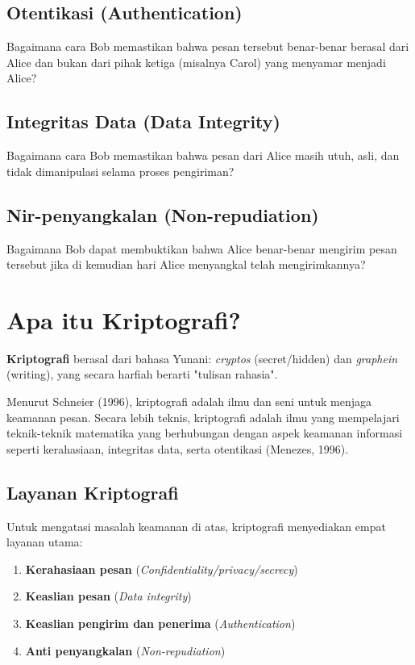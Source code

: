 \documentclass[../main.tex]{subfiles}
\begin{document}
\subsection{Otentikasi (Authentication)}
Bagaimana cara Bob memastikan bahwa pesan tersebut benar-benar berasal dari Alice dan bukan dari pihak ketiga (misalnya Carol) yang menyamar menjadi Alice?

\subsection{Integritas Data (Data Integrity)}
Bagaimana cara Bob memastikan bahwa pesan dari Alice masih utuh, asli, dan tidak dimanipulasi selama proses pengiriman?

\subsection{Nir-penyangkalan (Non-repudiation)}
Bagaimana Bob dapat membuktikan bahwa Alice benar-benar mengirim pesan tersebut jika di kemudian hari Alice menyangkal telah mengirimkannya?

\section{Apa itu Kriptografi?}
\textbf{Kriptografi} berasal dari bahasa Yunani: \textit{cryptos} (secret/hidden) dan \textit{graphein} (writing), yang secara harfiah berarti "tulisan rahasia".

Menurut Schneier (1996), kriptografi adalah ilmu dan seni untuk menjaga keamanan pesan. Secara lebih teknis, kriptografi adalah ilmu yang mempelajari teknik-teknik matematika yang berhubungan dengan aspek keamanan informasi seperti kerahasiaan, integritas data, serta otentikasi (Menezes, 1996).

\subsection{Layanan Kriptografi}
Untuk mengatasi masalah keamanan di atas, kriptografi menyediakan empat layanan utama:
\begin{enumerate}
    \item \textbf{Kerahasiaan pesan} (\textit{Confidentiality/privacy/secrecy})
    \item \textbf{Keaslian pesan} (\textit{Data integrity})
    \item \textbf{Keaslian pengirim dan penerima} (\textit{Authentication})
    \item \textbf{Anti penyangkalan} (\textit{Non-repudiation})
\end{enumerate}
\end{document}
